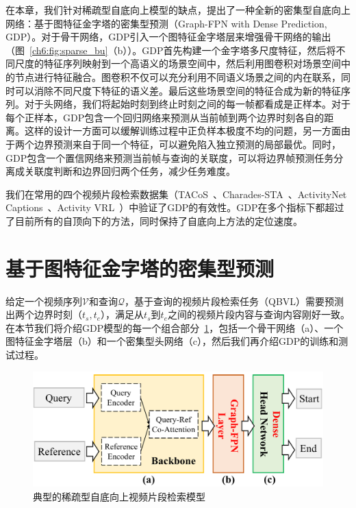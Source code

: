 在本章，我们针对稀疏型自底向上模型的缺点，提出了一种全新的密集型自底向上网络：基于图特征金字塔的密集型预测（Graph-FPN with Dense Prediction, GDP）。对于骨干网络，GDP引入一个图特征金字塔层来增强骨干网络的输出（图~\ref{ch6:fig:sparse_bu}（b））。GDP首先构建一个金字塔多尺度特征，然后将不同尺度的特征序列映射到一个高语义的场景空间中，然后利用图卷积对场景空间中的节点进行特征融合。图卷积不仅可以充分利用不同语义场景之间的内在联系，同时可以消除不同尺度下特征的语义差。最后这些场景空间的特征合成为新的特征序列。对于头网络，我们将起始时刻到终止时刻之间的每一帧都看成是正样本。对于每个正样本，GDP包含一个回归网络来预测从当前帧到两个边界时刻各自的距离。这样的设计一方面可以缓解训练过程中正负样本极度不均的问题，另一方面由于两个边界预测来自于同一个特征，可以避免陷入独立预测的局部最优。同时，GDP包含一个置信网络来预测当前帧与查询的关联度，可以将边界帧预测任务分离成关联度判断和边界回归两个任务，减少任务难度。


我们在常用的四个视频片段检索数据集（TACoS~\cite{regneri2013grounding}、Charades-STA~\cite{gao2017tall}、ActivityNet Captions~\cite{krishna2017dense}、Activity VRL~\cite{feng2018video}）中验证了GDP的有效性。GDP在多个指标下都超过了目前所有的自顶向下的方法，同时保持了自底向上方法的定位速度。

\section{基于图特征金字塔的密集型预测}

给定一个视频序列$\mathcal{V}$和查询$\mathcal{Q}$，基于查询的视频片段检索任务（QBVL）需要预测出两个边界时刻（$t_s, t_e$），满足从$t_s$到$t_e$之间的视频片段内容与查询内容刚好一致。在本节我们将介绍GDP模型的每一个组合部分~\ref{ch6:fig:dense_bu}，包括一个骨干网络（a）、一个图特征金字塔层（b）和一个密集型头网络（c），然后我们再介绍GDP的训练和测试过程。

\begin{figure}[htbp]
    \centering
    \includegraphics[width=0.7\linewidth]{chapter6/res/dense_bu.pdf}
    \caption{典型的稀疏型自底向上视频片段检索模型}
    \label{ch6:fig:dense_bu}
\end{figure}

